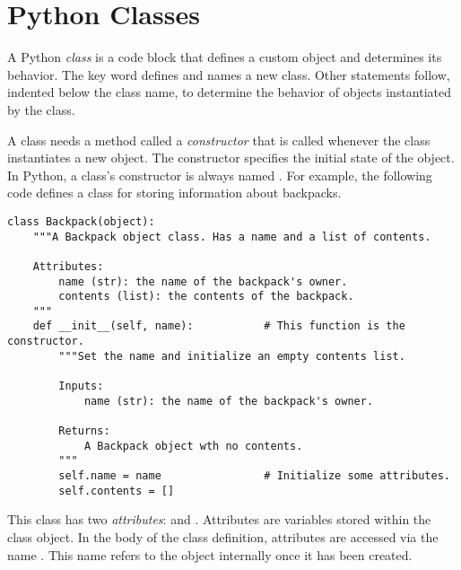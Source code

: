 \label{lab:OOP}

\section*{Python Classes} %

A Python \emph{class} is a code block that defines a custom object and determines its behavior.
The  key word defines and names a new class.
Other statements follow, indented below the class name, to determine the behavior of objects instantiated by the class.

A class needs a method called a \emph{constructor} that is called whenever the class instantiates a new object.
The constructor specifies the initial state of the object.
In Python, a class's constructor is always named .
For example, the following code defines a class for storing information about backpacks.

\begin{lstlisting}
class Backpack(object):
    """A Backpack object class. Has a name and a list of contents.

    Attributes:
        name (str): the name of the backpack's owner.
        contents (list): the contents of the backpack.
    """
    def __init__(self, name):           # This function is the constructor.
        """Set the name and initialize an empty contents list.

        Inputs:
            name (str): the name of the backpack's owner.

        Returns:
            A Backpack object wth no contents.
        """
        self.name = name                # Initialize some attributes.
        self.contents = []
\end{lstlisting}

This  class has two \emph{attributes}:  and .
Attributes are variables stored within the class object.
In the body of the class definition, attributes are accessed via the name .
This name refers to the object internally once it has been created.

